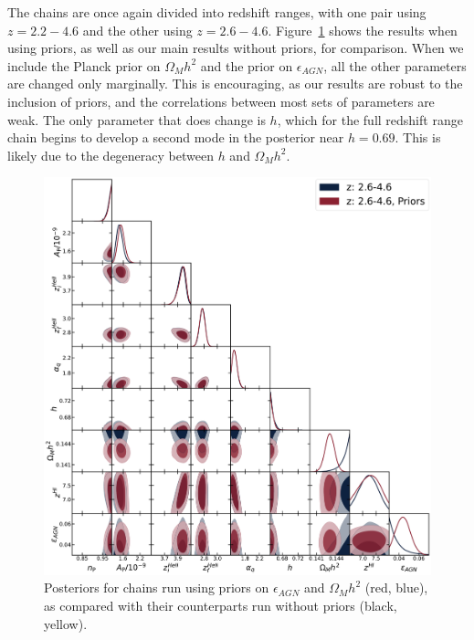 \documentclass[a4paper,11pt]{article}
\begin{document}
The chains are once again divided into redshift ranges, with one pair using $z=2.2-4.6$ and the other using $z=2.6-4.6$.
Figure~\ref{fig:priors_corner} shows the results when using priors, as well as our main results without priors, for comparison.
When we include the Planck prior on $\Omega_M h^2$ and the prior on $\epsilon_{AGN}$, all the other parameters are changed only marginally.
This is encouraging, as our results are robust to the inclusion of priors, and the correlations between most sets of parameters are weak.
The only parameter that does change is $h$, which for the full redshift range chain begins to develop a second mode in the posterior near $h=0.69$.
This is likely due to the degeneracy between $h$ and $\Omega_M h^2$.

\begin{figure}
    \centering
    \includegraphics[width=\textwidth]{figures/priors.pdf}
    \caption{\label{fig:priors_corner}
    Posteriors for chains run using priors on $\epsilon_{AGN}$ and $\Omega_M h^2$ (red, blue), as compared with their counterparts run without priors (black, yellow).
    }
\end{figure}

\end{document}

